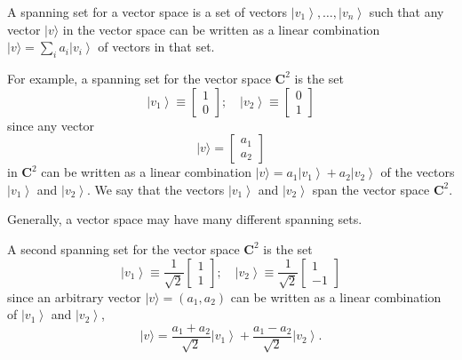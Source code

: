 A spanning set for a vector space is a set of vectors $\left|v_{1}\right\rangle, \ldots,\left|v_{n}\right\rangle$ such that any vector $|v\rangle$ in the vector space can be written as a linear combination $|v\rangle=\sum_{i} a_{i}\left|v_{i}\right\rangle$ of vectors in that set. 

\begin{example}
    For example, a spanning set for the vector space $\mathbf{C}^{2}$ is the set
    $$
    \left|v_{1}\right\rangle \equiv\left[\begin{array}{l}
    1 \\
    0
    \end{array}\right] ; \quad\left|v_{2}\right\rangle  \equiv\left[\begin{array}{l}
    0 \\
    1
    \end{array}\right]
  $$
    since any vector
    $$
    |v\rangle=\left[\begin{array}{l}
    a_{1} \\
    a_{2}
    \end{array}\right]
    $$
    in $\mathbf{C}^{2}$ can be written as a linear combination $|v\rangle=a_{1}\left|v_{1}\right\rangle+a_{2}\left|v_{2}\right\rangle$ of the vectors $\left|v_{1}\right\rangle$ and $\left|v_{2}\right\rangle$. We say that the vectors $\left|v_{1}\right\rangle$ and $\left|v_{2}\right\rangle$ span the vector space $\mathbf{C}^{2}$.
\end{example}

Generally, a vector space may have many different spanning sets. 

\begin{example}
A second spanning set for the vector space $\mathbf{C}^{2}$ is the set
$$
\left|v_{1}\right\rangle \equiv \frac{1}{\sqrt{2}}\left[\begin{array}{l}
1 \\
1
\end{array}\right] ; \quad\left|v_{2}\right\rangle \equiv \frac{1}{\sqrt{2}}\left[\begin{array}{r}
1 \\
-1
\end{array}\right]
$$
since an arbitrary vector $|v\rangle=\left(a_{1}, a_{2}\right)$ can be written as a linear combination of $\left|v_{1}\right\rangle$ and $\left|v_{2}\right\rangle$,
$$
|v\rangle=\frac{a_{1}+a_{2}}{\sqrt{2}}\left|v_{1}\right\rangle+\frac{a_{1}-a_{2}}{\sqrt{2}}\left|v_{2}\right\rangle.
$$
\end{example}

